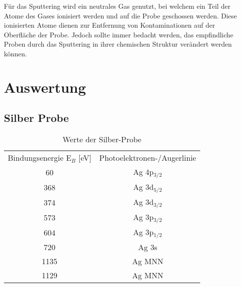 \documentclass{article}
\newcommand\addplotdd{\directlua{drawAGDD()}}
\begin{document}
Für das Sputtering wird ein neutrales Gas genutzt, bei welchem ein Teil der Atome des Gases ionisiert werden und auf die Probe geschossen werden. Diese ionisierten Atome dienen zur Entfernung von Kontaminationen auf der Oberfläche der Probe. Jedoch sollte immer bedacht werden, das empfindliche Proben durch das Sputtering in ihrer chemischen Struktur verändert werden können. 



\section{Auswertung}

\subsection{Silber Probe}

\begin{table}[htpb]
  \centering
  \caption{Werte der Silber-Probe}
  \label{tab:chsc}
  \begin{tabular}{cc}
   Bindungsenergie E$_B$ [eV] & Photoelektronen-/Augerlinie\\
  60 & Ag 4p$_{3/2}$ \\
 368 & Ag 3d$_{5/2}$ \\
 374 & Ag 3d$_{3/2}$ \\
 573 & Ag 3p$_{3/2}$ \\
 604 & Ag 3p$_{1/2}$ \\
 720 & Ag 3s \\
 1135 & Ag MNN \\
 1129 & Ag MNN \\
  
  \end{tabular}

\end{table}


%


\end{document}
